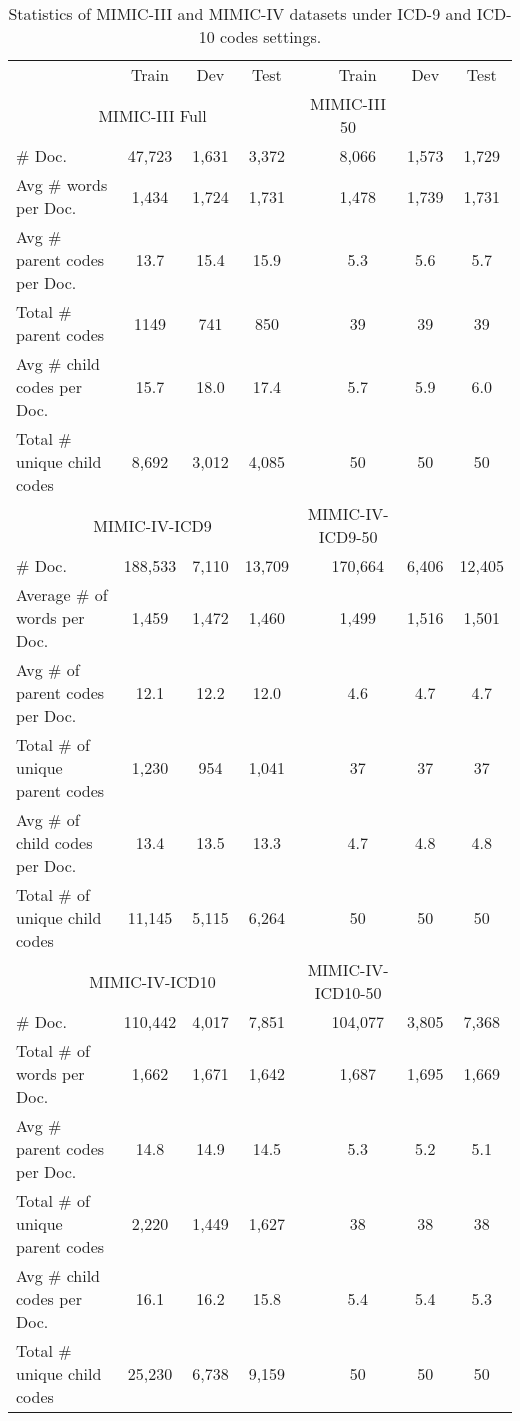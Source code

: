 \documentclass[11pt]{article}
\begin{document}
\begin{table*}[ht]
    \centering
    \small
    \begin{tabular}{lccccccc}
    \toprule
    & Train & Dev & Test & & Train & Dev & Test \\
    \multicolumn{4}{c}{MIMIC-III Full} & \multicolumn{2}{c}{MIMIC-III 50} \\
    \midrule
    \# Doc. & 47,723 & 1,631 & 3,372 & &8,066 &1,573 &1,729\\
    Avg \# words per Doc. & 1,434 & 1,724 & 1,731 & &1,478 & 1,739&1,731 \\
    Avg \# parent codes per Doc. & 13.7 & 15.4 & 15.9  & &5.3 &5.6 &5.7 \\ 
    Total \# parent codes & 1149 & 741 & 850  & & 39& 39&39\\
    Avg \# child codes per Doc. & 15.7 & 18.0 & 17.4  & & 5.7&5.9 &6.0\\ 
    Total \# unique child codes & 8,692 & 3,012 & 4,085  & &50 &50 & 50\\ 
    \midrule
    \multicolumn{4}{c}{MIMIC-IV-ICD9} & \multicolumn{2}{c}{MIMIC-IV-ICD9-50}\\
    \midrule
    \# Doc. & 188,533 & 7,110 & 13,709 & & 170,664 & 6,406 &12,405\\
    Average \# of words per Doc. & 1,459 & 1,472 & 1,460 & &1,499&1,516&1,501\\
    Avg \# of parent codes per Doc. & 12.1 & 12.2 & 12.0  & &4.6 & 4.7&4.7\\ 
    Total \# of unique parent codes & 1,230 & 954 & 1,041  & & 37& 37& 37\\
    Avg \# of child codes per Doc. & 13.4 & 13.5 & 13.3  & & 4.7& 4.8&4.8\\ 
    Total \# of unique child codes & 11,145 & 5,115 & 6,264  & &50 &50 &50\\

    \midrule
    \multicolumn{4}{c}{MIMIC-IV-ICD10} & \multicolumn{2}{c}{MIMIC-IV-ICD10-50}\\
    \midrule
    \# Doc. & 110,442 & 4,017 & 7,851 & &104,077& 3,805& 7,368\\
    Total \# of words per Doc. & 1,662 & 1,671 & 1,642 & &1,687 & 1,695& 1,669\\
    Avg \# parent codes per Doc. & 14.8 & 14.9 & 14.5 & &5.3&5.2&5.1\\ 
    Total \# of unique parent codes & 2,220 & 1,449 & 1,627 & &38 &38 &38\\
    Avg \# child codes per Doc. & 16.1 & 16.2 & 15.8 & &5.4 &5.4 &5.3\\ 
    Total \# unique child codes & 25,230 & 6,738 & 9,159 & & 50 &50 &50\\
    
    \bottomrule
    
    \end{tabular}
    \caption{Statistics of MIMIC-III and MIMIC-IV datasets under ICD-9 and ICD-10 codes settings.}
    \label{tab:statistic dataset}
\end{table*}
\end{document}
